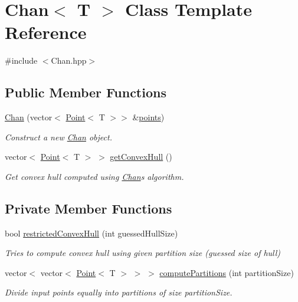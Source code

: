 \hypertarget{classChan}{}\section{Chan$<$ T $>$ Class Template Reference}
\label{classChan}


{\ttfamily \#include $<$Chan.\+hpp$>$}

\subsection*{Public Member Functions}
\begin{DoxyCompactItemize}
\item 
\mbox{\hyperlink{classChan_ae9805532068f340bfc2947bd48796f31}{Chan}} (vector$<$ \mbox{\hyperlink{classPoint}{Point}}$<$ T $>$$>$ \&\mbox{\hyperlink{classChan_a492d7e3f31f1fd1e06f5ff464eec0492}{points}})
\begin{DoxyCompactList}\small\item\em Construct a new \mbox{\hyperlink{classChan}{Chan}} object. \end{DoxyCompactList}\item 
vector$<$ \mbox{\hyperlink{classPoint}{Point}}$<$ T $>$ $>$ \mbox{\hyperlink{classChan_a3cfcc1c908e1b4fde9bddb33d1af6d65}{get\+Convex\+Hull}} ()
\begin{DoxyCompactList}\small\item\em Get convex hull computed using \mbox{\hyperlink{classChan}{Chan}}\textquotesingle{}s algorithm. \end{DoxyCompactList}\end{DoxyCompactItemize}
\subsection*{Private Member Functions}
\begin{DoxyCompactItemize}
\item 
bool \mbox{\hyperlink{classChan_a773b2ebe27132ccfacedd5efebd63093}{restricted\+Convex\+Hull}} (int guessed\+Hull\+Size)
\begin{DoxyCompactList}\small\item\em Tries to compute convex hull using given partition size (guessed size of hull) \end{DoxyCompactList}\item 
vector$<$ vector$<$ \mbox{\hyperlink{classPoint}{Point}}$<$ T $>$ $>$ $>$ \mbox{\hyperlink{classChan_a6c42d1c1eab98ab7fb9a3a851f51f305}{compute\+Partitions}} (int partition\+Size)
\begin{DoxyCompactList}\small\item\em Divide input points equally into partitions of size \textquotesingle{}partition\+Size\textquotesingle{}. \end{DoxyCompactList}\end{DoxyCompactItemize}
